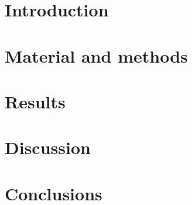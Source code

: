 \documentclass[preprint,12p]{elsarticle}
\begin{document}
	 


	\section{Introduction}
	\label{intro}
	

	\section{Material and methods}
	\label{methods}
	

	\section{Results}
	\label{results}
	

	\section{Discussion}
	\label{sec:discussion}
	

	\section{Conclusions}
	\label{conclusions}
	

	 

	
\end{document}

